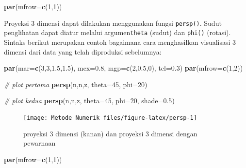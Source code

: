 \documentclass[
]{book}
\newenvironment{Shaded}{\begin{snugshade}}{\end{snugshade}}
\newcommand{\AttributeTok}[1]{\textcolor[rgb]{0.13,0.29,0.53}{#1}}
\newcommand{\CommentTok}[1]{\textcolor[rgb]{0.56,0.35,0.01}{\textit{#1}}}
\newcommand{\DecValTok}[1]{\textcolor[rgb]{0.00,0.00,0.81}{#1}}
\newcommand{\FloatTok}[1]{\textcolor[rgb]{0.00,0.00,0.81}{#1}}
\newcommand{\FunctionTok}[1]{\textcolor[rgb]{0.13,0.29,0.53}{\textbf{#1}}}
\newcommand{\NormalTok}[1]{#1}
\theoremstyle{definition}
\theoremstyle{definition}
\theoremstyle{definition}
\theoremstyle{definition}
\theoremstyle{remark}
\begin{document}
\begin{Shaded}
\begin{Highlighting}[]
\FunctionTok{par}\NormalTok{(}\AttributeTok{mfrow=}\FunctionTok{c}\NormalTok{(}\DecValTok{1}\NormalTok{,}\DecValTok{1}\NormalTok{))}
\end{Highlighting}
\end{Shaded}

Proyeksi 3 dimensi dapat dilakukan menggunakan fungsi \texttt{persp()}. Sudut penglihatan dapat diatur melalui argumen\texttt{theta} (sudut) dan \texttt{phi()} (rotasi). Sintaks berikut merupakan contoh bagaimana cara menghasilkan visualisasi 3 dimensi dari data yang telah diproduksi sebelumnya:

\begin{Shaded}
\begin{Highlighting}[]
\FunctionTok{par}\NormalTok{(}\AttributeTok{mar=}\FunctionTok{c}\NormalTok{(}\DecValTok{3}\NormalTok{,}\DecValTok{3}\NormalTok{,}\FloatTok{1.5}\NormalTok{,}\FloatTok{1.5}\NormalTok{), }\AttributeTok{mex=}\FloatTok{0.8}\NormalTok{, }\AttributeTok{mgp=}\FunctionTok{c}\NormalTok{(}\DecValTok{2}\NormalTok{,}\FloatTok{0.5}\NormalTok{,}\DecValTok{0}\NormalTok{), }\AttributeTok{tcl=}\FloatTok{0.3}\NormalTok{)}
\FunctionTok{par}\NormalTok{(}\AttributeTok{mfrow=}\FunctionTok{c}\NormalTok{(}\DecValTok{1}\NormalTok{,}\DecValTok{2}\NormalTok{))}

\CommentTok{\# plot pertama}
\FunctionTok{persp}\NormalTok{(n,n,z, }\AttributeTok{theta=}\DecValTok{45}\NormalTok{, }\AttributeTok{phi=}\DecValTok{20}\NormalTok{)}

\CommentTok{\# plot kedua}
\FunctionTok{persp}\NormalTok{(n,n,z, }\AttributeTok{theta=}\DecValTok{45}\NormalTok{, }\AttributeTok{phi=}\DecValTok{20}\NormalTok{, }\AttributeTok{shade=}\FloatTok{0.5}\NormalTok{)}
\end{Highlighting}
\end{Shaded}

\begin{figure}

{\centering \texttt{[image: Metode\_Numerik\_files/figure-latex/persp-1]} 

}

\caption{proyeksi 3 dimensi (kanan) dan proyeksi 3 dimensi dengan pewarnaan}\label{fig:persp}
\end{figure}

\begin{Shaded}
\begin{Highlighting}[]
\FunctionTok{par}\NormalTok{(}\AttributeTok{mfrow=}\FunctionTok{c}\NormalTok{(}\DecValTok{1}\NormalTok{,}\DecValTok{1}\NormalTok{))}
\end{Highlighting}
\end{Shaded}
\end{document}
